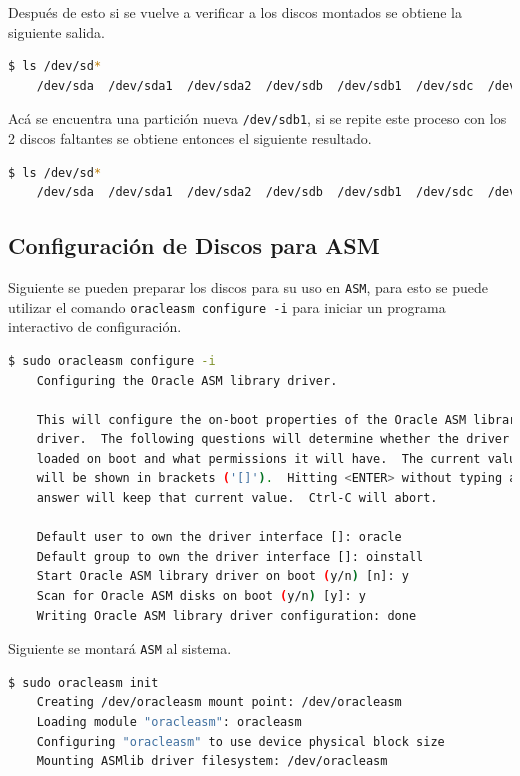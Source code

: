 \documentclass{article}
\begin{document}
Después de esto si se vuelve a verificar a los discos montados se obtiene la siguiente salida.

\begin{lstlisting}[style=mystyle,language=bash]
	$ ls /dev/sd*
	/dev/sda  /dev/sda1  /dev/sda2  /dev/sdb  /dev/sdb1  /dev/sdc  /dev/sdd
\end{lstlisting}

Acá se encuentra una partición nueva \texttt{/dev/sdb1}, si se repite este proceso con los 2 discos faltantes se obtiene entonces el siguiente resultado.

\begin{lstlisting}[style=mystyle,language=bash]
	$ ls /dev/sd*
	/dev/sda  /dev/sda1  /dev/sda2  /dev/sdb  /dev/sdb1  /dev/sdc  /dev/sdc1  /dev/sdd  /dev/sdd1
\end{lstlisting}

\subsection{Configuración de Discos para ASM}

Siguiente se pueden preparar los discos para su uso en \texttt{ASM}, para esto se puede utilizar el comando \texttt{oracleasm configure -i} para iniciar un programa interactivo de configuración.

\begin{lstlisting}[style=mystyle,language=bash]
	$ sudo oracleasm configure -i
	Configuring the Oracle ASM library driver.

	This will configure the on-boot properties of the Oracle ASM library
	driver.  The following questions will determine whether the driver is
	loaded on boot and what permissions it will have.  The current values
	will be shown in brackets ('[]').  Hitting <ENTER> without typing an
	answer will keep that current value.  Ctrl-C will abort.

	Default user to own the driver interface []: oracle
	Default group to own the driver interface []: oinstall
	Start Oracle ASM library driver on boot (y/n) [n]: y
	Scan for Oracle ASM disks on boot (y/n) [y]: y
	Writing Oracle ASM library driver configuration: done
\end{lstlisting}

Siguiente se montará \texttt{ASM} al sistema.

\begin{lstlisting}[style=mystyle,language=bash]
	$ sudo oracleasm init
	Creating /dev/oracleasm mount point: /dev/oracleasm
	Loading module "oracleasm": oracleasm
	Configuring "oracleasm" to use device physical block size
	Mounting ASMlib driver filesystem: /dev/oracleasm
\end{lstlisting}
\end{document}
